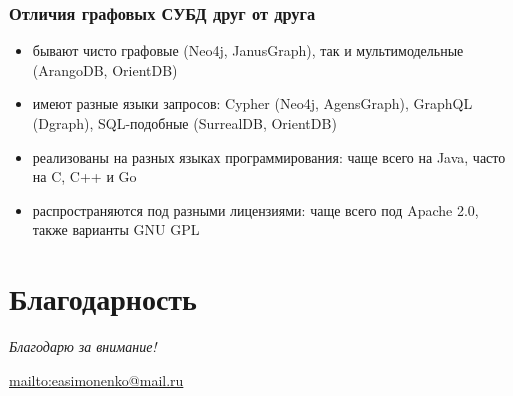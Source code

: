 \documentclass[11pt]{beamer}
\begin{document}
\begin{frame}
  \frametitle{Отличия графовых СУБД друг от друга}
  \begin{itemize}
  \item бывают чисто графовые (Neo4j, JanusGraph), так и мультимодельные (ArangoDB, OrientDB)
  \item имеют разные языки запросов: Cypher (Neo4j, AgensGraph), GraphQL (Dgraph), SQL-подобные (SurrealDB, OrientDB)
  \item реализованы на разных языках программирования: чаще всего на Java, часто на C, C++ и Go
  \item распространяются под разными лицензиями: чаще всего под Apache 2.0, также варианты GNU GPL
  \end{itemize}
\end{frame}

\section*{Благодарность}

\begin{frame}
  \center
  \textit{Благодарю за внимание!}
  
  \textbf{\textsl{\inserttitle}}

  \insertauthor

  \url{mailto:easimonenko@mail.ru}

  \insertinstitute
\end{frame}
\end{document}
